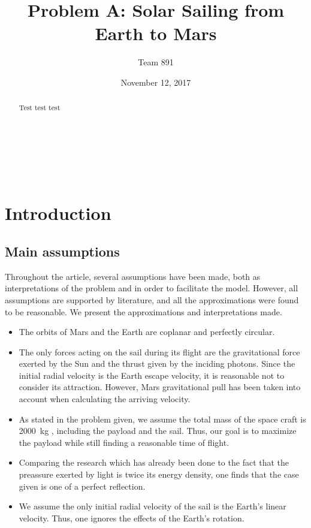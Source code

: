 \documentclass[twocolumn,12pt,a4paper]{article}
\author{\textsf{Team 891}}
\title{\textsf{\textbf{Problem A: Solar Sailing from Earth to Mars}}}
\date{\textsf{November 12, 2017}}
\numberwithin{equation}{section}
\begin{document}
\renewcommand{\abstractname}{}
\renewcommand{\absnamepos}{empty}
\begin{titlingpage}
 \maketitle

\noindent \hrulefill \\
\begin{abstract}
Test test test

\end{abstract}
\hrulefill \\

\end{titlingpage}

\clearpage

\section{Introduction}
\subsection{Main assumptions}
Throughout the article, several assumptions have been made, both as interpretations of the problem and in order to facilitate the model. However, all assumptions are supported by literature, and all the approximations were found to be reasonable. We present the approximations and interpretations made.
\begin{itemize}
\item The orbits of Mars and the Earth are coplanar and perfectly circular.
\item The only forces acting on the sail during its flight are the gravitational force exerted by the Sun and the thrust given by the inciding photons. Since the initial radial velocity is the Earth escape velocity, it is reasonable not to consider its attraction. However, Mars gravitational pull has been taken into account when calculating the arriving velocity.
\item As stated in the problem given, we assume the total mass of the space craft is \SI{2 000}{kg} , including the payload and the sail. Thus, our goal is to maximize the payload while still finding a reasonable time of flight. 
\item Comparing the research which has already been done to the fact that the preassure exerted by light is twice its energy density, one finds that the case given is one of a perfect reflection.
\item We assume the only initial radial velocity of the sail is the Earth's linear velocity. Thus, one ignores the effects of the Earth's rotation.
\end{itemize}
\end{document}
